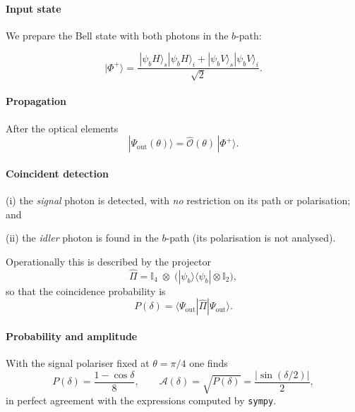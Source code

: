 \documentclass{article}
\begin{document}
\paragraph{Input state}

We prepare the Bell state with both photons in the \(b\)-path:

\[
|\Phi^{+}\rangle=
\frac{\,|\psi_bH\rangle_{\!s}|\psi_bH\rangle_{\!i}
      +|\psi_bV\rangle_{\!s}|\psi_bV\rangle_{\!i}}{\sqrt{2}}.
\]

\paragraph{Propagation}

After the optical elements
\[
|\Psi_{\mathrm{out}}(\theta)\rangle
=\hat{\mathcal{O}}(\theta)\,|\Phi^{+}\rangle.
\]

\paragraph{Coincident detection}

(i) the \emph{signal} photon is detected, with \emph{no} restriction on
its path or polarisation; and

(ii) the \emph{idler} photon is found in the \(b\)-path
(its polarisation is not analysed).

Operationally this is described by the projector
\[
\hat{\Pi}=\mathbb{I}_{4}\;\otimes\;
\bigl(|\psi_b\rangle\langle\psi_b|\otimes\mathbb{I}_{2}\bigr),
\]
so that the coincidence probability is
\[
P(\delta)=\langle\Psi_{\mathrm{out}}|\hat{\Pi}|\Psi_{\mathrm{out}}\rangle.
\]

\paragraph{Probability and amplitude}

With the signal polariser fixed at \(\theta=\pi/4\) one finds
\[
P(\delta)=\frac{1-\cos\delta}{8},\qquad
\mathcal{A}(\delta)=\sqrt{P(\delta)}
                  =\frac{\bigl|\sin(\delta/2)\bigr|}{2},
\]
in perfect agreement with the expressions computed by
\texttt{sympy}.
\end{document}
